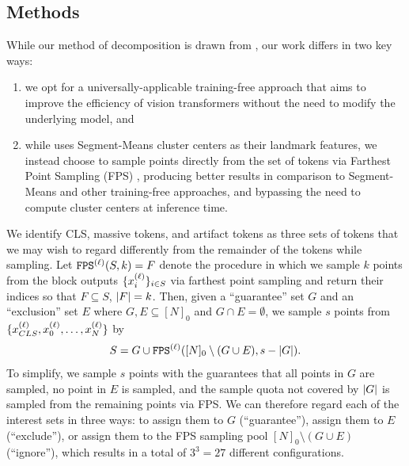 \subsection{Methods}

While our method of decomposition is drawn from \cite{xiong2021nystromformer}, our work differs in two key ways: 
\begin{enumerate}[label=\arabic*)]
    \item we opt for a universally-applicable training-free approach that aims to improve the efficiency of vision transformers without the need to modify the underlying model, and
    \vspace{-0.2cm}
    \item while \cite{xiong2021nystromformer} uses Segment-Means cluster centers as their landmark features, we instead choose to sample points directly from the set of tokens via Farthest Point Sampling (FPS) \cite{qi2017fps}, producing better results in comparison to Segment-Means and other training-free approaches, and bypassing the need to compute cluster centers at inference time.
\end{enumerate}


We identify CLS, massive tokens, and artifact tokens as three sets of tokens that we may wish to regard differently from the remainder of the tokens while sampling. Let $\texttt{FPS}^{(\ell)}(S, k) = F$ denote the procedure in which we sample $k$ points from the block outputs $\{x^{(\ell)}_{i}\}_{i \in S}$ via farthest point sampling and return their indices so that $F \subseteq S$, $\left\lvert F \right\rvert = k$. Then, given a ``guarantee'' set $G$ and an ``exclusion'' set $E$ where $G, E \subseteq [N]_0$ and $G \cap E = \emptyset$, we sample $s$ points from $\{x^{(\ell)}_{CLS}, x^{(\ell)}_{0}, \ldots, x^{(\ell)}_{N}\}$ by \begin{align}
    S = G \cup \texttt{FPS}^{(\ell)}([N]_0 \setminus (G \cup E), s - \left\lvert G \right\rvert).
\end{align} 
To simplify, we sample $s$ points with the guarantees that all points in $G$ are sampled, no point in $E$ is sampled, and the sample quota not covered by $\left\lvert G \right\rvert$ is sampled from the remaining points via FPS. We can therefore regard each of the interest sets in three ways: to assign them to $G$ (``guarantee''), assign them to $E$ (``exclude''), or assign them to the FPS sampling pool $[N]_0 \setminus (G \cup E)$ (``ignore''), which results in a total of $3^3 = 27$ different configurations.

